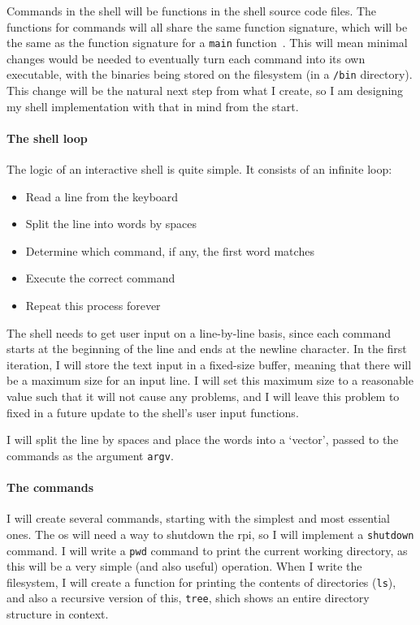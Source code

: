 \documentclass{article}
\begin{document}
Commands in the shell will be functions in the shell source code files. The
functions for commands will all share the same function signature, which will
be the same as the function signature for a \texttt{main}
function~\cite{c-main-func}. This will mean minimal changes would be needed to
eventually turn each command into its own executable, with the binaries being
stored on the filesystem (in a \texttt{/bin} directory). This change will be
the natural next step from what I create, so I am designing my shell
implementation with that in mind from the start.

\paragraph{The shell loop}
The logic of an interactive shell is quite simple. It consists of an infinite
loop:

\begin{itemize}
    \item Read a line from the keyboard
    \item Split the line into words by spaces
    \item Determine which command, if any, the first word matches
    \item Execute the correct command
    \item Repeat this process forever
\end{itemize}

The shell needs to get user input on a line-by-line basis, since each command
starts at the beginning of the line and ends at the newline character. In the
first iteration, I will store the text input in a fixed-size buffer, meaning
that there will be a maximum size for an input line. I will set this maximum
size to a reasonable value such that it will not cause any problems, and I will
leave this problem to fixed in a future update to the shell's user input
functions.

I will split the line by spaces and place the words into a `vector',
passed to the commands as the argument \texttt{argv}.

\paragraph{The commands}
I will create several commands, starting with the simplest and most essential
ones. The \gls{os} will need a way to shutdown the \gls{rpi}, so I will
implement a \texttt{shutdown} command. I will write a \texttt{pwd} command to
print the current working directory, as this will be a very simple (and also
useful) operation. When I write the filesystem, I will create a function for
printing the contents of directories (\texttt{ls}), and also a recursive
version of this, \texttt{tree}, shich shows an entire directory structure in
context.
\end{document}
